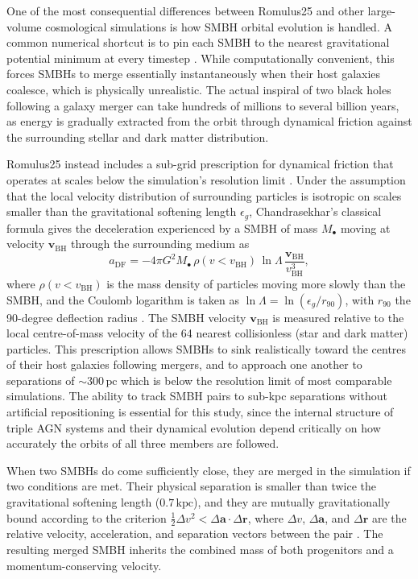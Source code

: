 \documentclass[twocolumn, 10pt]{article}
\begin{document}
One of the most consequential differences between Romulus25 and other large-volume cosmological simulations is how SMBH orbital evolution is handled. A common numerical shortcut is to pin each SMBH to the nearest gravitational potential minimum at every timestep \citep[e.g.][]{Dave2019}. While computationally convenient, this forces SMBHs to merge essentially instantaneously when their host galaxies coalesce, which is physically unrealistic. The actual inspiral of two black holes following a galaxy merger can take hundreds of millions to several billion years, as energy is gradually extracted from the orbit through dynamical friction against the surrounding stellar and dark matter distribution.

Romulus25 instead includes a sub-grid prescription for dynamical friction that operates at scales below the simulation's resolution limit \citep{Tremmel2015}. Under the assumption that the local velocity distribution of surrounding particles is isotropic on scales smaller than the gravitational softening length $\epsilon_g$, Chandrasekhar's classical formula gives the deceleration experienced by a SMBH of mass $M_\bullet$ moving at velocity $\mathbf{v}_\mathrm{BH}$ through the surrounding medium as
%
\begin{equation}
    a_\mathrm{DF} = -4\pi G^2 M_\bullet\,\rho(v < v_\mathrm{BH})\,\ln\Lambda\,\frac{\mathbf{v}_\mathrm{BH}}{v_\mathrm{BH}^3},
    \label{eq:df}
\end{equation}
%
where $\rho(v < v_\mathrm{BH})$ is the mass density of particles moving more slowly than the SMBH, and the Coulomb logarithm is taken as $\ln\Lambda = \ln(\epsilon_g / r_{90})$, with $r_{90}$ the 90-degree deflection radius \citep{Tremmel2015, Saeedzadeh2024}. The SMBH velocity $\mathbf{v}_\mathrm{BH}$ is measured relative to the local centre-of-mass velocity of the 64 nearest collisionless (star and dark matter) particles. This prescription allows SMBHs to sink realistically toward the centres of their host galaxies following mergers, and to approach one another to separations of $\sim 300\,\mathrm{pc}$ which is below the resolution limit of most comparable simulations. The ability to track SMBH pairs to sub-kpc separations without artificial repositioning is essential for this study, since the internal structure of triple AGN systems and their dynamical evolution depend critically on how accurately the orbits of all three members are followed.

When two SMBHs do come sufficiently close, they are merged in the simulation if two conditions are met. Their physical separation is smaller than twice the gravitational softening length ($0.7\,\mathrm{kpc}$), and they are mutually gravitationally bound according to the criterion $\frac{1}{2}\Delta v^2 < \Delta\mathbf{a} \cdot \Delta\mathbf{r}$, where $\Delta v$, $\Delta\mathbf{a}$, and $\Delta\mathbf{r}$ are the relative velocity, acceleration, and separation vectors between the pair \citep{Bellovary2011, Tremmel2017}. The resulting merged SMBH inherits the combined mass of both progenitors and a momentum-conserving velocity.
\end{document}
